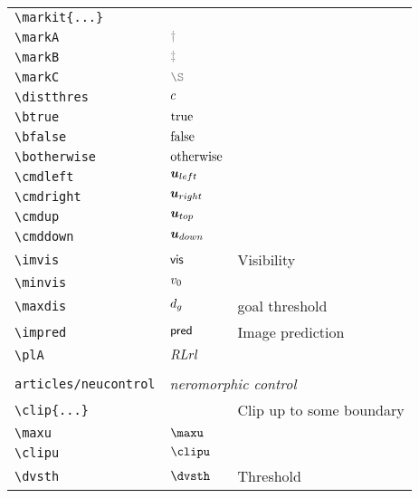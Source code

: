 \begin{longtable}{lll}
 {\color[rgb]{0.5,0.5,0.5}\texttt{\textbackslash markit\{...\}}} &  & \\ 
 {\color[rgb]{0.5,0.5,0.5}\texttt{\textbackslash markA}} & $\markA$ & \\ 
 {\color[rgb]{0.5,0.5,0.5}\texttt{\textbackslash markB}} & $\markB$ & \\ 
 {\color[rgb]{0.5,0.5,0.5}\texttt{\textbackslash markC}} & $\markC$ & \\ 
 {\color[rgb]{0.5,0.5,0.5}\texttt{\textbackslash distthres}} & $c$ & \\ 
 {\color[rgb]{0.5,0.5,0.5}\texttt{\textbackslash btrue}} & $\text{true}$ & \\ 
 {\color[rgb]{0.5,0.5,0.5}\texttt{\textbackslash bfalse}} & $\text{false}$ & \\ 
 {\color[rgb]{0.5,0.5,0.5}\texttt{\textbackslash botherwise}} & $\text{otherwise}$ & \\ 
 {\color[rgb]{0.5,0.5,0.5}\texttt{\textbackslash cmdleft}} & $\boldsymbol{u}_{left}$ & \\ 
 {\color[rgb]{0.5,0.5,0.5}\texttt{\textbackslash cmdright}} & $\boldsymbol{u}_{right}$ & \\ 
 {\color[rgb]{0.5,0.5,0.5}\texttt{\textbackslash cmdup}} & $\boldsymbol{u}_{top}$ & \\ 
 {\color[rgb]{0.5,0.5,0.5}\texttt{\textbackslash cmddown}} & $\boldsymbol{u}_{down}$ & \\ 
 {\color[rgb]{0.5,0.5,0.5}\texttt{\textbackslash imvis}} & $\mathsf{vis}$ &  Visibility\\ 
 {\color[rgb]{0.5,0.5,0.5}\texttt{\textbackslash minvis}} & $v_0$ & \\ 
 {\color[rgb]{0.5,0.5,0.5}\texttt{\textbackslash maxdis}} & $d_g$ &  goal threshold\\ 
 {\color[rgb]{0.5,0.5,0.5}\texttt{\textbackslash impred}} & $\mathsf{pred}$ &  Image prediction\\ 
 {\color[rgb]{0.5,0.5,0.5}\texttt{\textbackslash plA}} & $RLrl$ & \\ 
  &  & \\ 
 {\color[rgb]{0.5,0.5,0.5}\texttt{articles/neucontrol}} & \multicolumn{2}{l}{\emph{neromorphic control}}\\ 
 \hline
{\color[rgb]{0.5,0.5,0.5}\texttt{\textbackslash clip\{...\}}} &  &  Clip up to some boundary \\ 
 {\color[rgb]{0.5,0.5,0.5}\texttt{\textbackslash maxu}} & $\maxu$ & \\ 
 {\color[rgb]{0.5,0.5,0.5}\texttt{\textbackslash clipu}} & $\clipu$ & \\ 
 {\color[rgb]{0.5,0.5,0.5}\texttt{\textbackslash dvsth}} & $\dvsth$ &  Threshold\\ 

\end{longtable}
